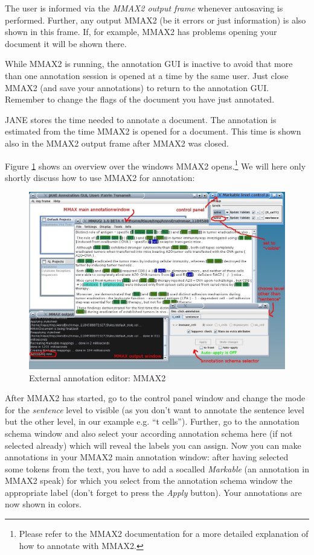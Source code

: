 \documentclass[DIV12,english,11pt,halfparskip]{scrartcl}
\begin{document}
The user is informed via the \emph{MMAX2 output frame} whenever
autosaving is performed.  Further, any output MMAX2 (be it errors or
just information) is also shown in this frame. If, for example, MMAX2
has problems opening your document it will be shown there. 

While MMAX2 is running, the annotation GUI is inactive to avoid that
more than one annotation session is opened at a time by the same
user. Just close MMAX2 (and save your annotations) to return to the
annotation GUI. Remember to change the flags of the document you have
just annotated.

JANE stores the time needed to annotate a document. The annotation is
estimated from the time MMAX2 is opened for a document. This time is
shown also in the MMAX2 output frame after MMAX2 was closed.

Figure \ref{fig:mmax} shows an overview over the windows MMAX2
opens.\footnote{Please refer to the MMAX2 documentation for a more
  detailed explanation of how to annotate with MMAX2.} We will here
only shortly discuss how to use MMAX2 for annotation:

\begin{figure}[tb]
  \centering
  \includegraphics[scale=0.4]{figs/MMAX2.jpg}
  \caption{External annotation editor: MMAX2}
  \label{fig:mmax}
\end{figure}



After MMAX2 has started, go to the control panel window and change the
mode for the \emph{sentence} level to visible (as you don't want to
annotate the sentence level but the other level, in our example e.g.
``t cells''). Further, go to the annotation schema window and also
select your according annotation schema here (if not selected already)
which will reveal the labels you can assign. Now you can make
annotations in your MMAX2 main annotation window: after having selected
some tokens from the text, you have to add a socalled \emph{Markable}
(an annotation in MMAX2 speak) for which you select from the annotation
schema window the appropriate label (don't forget to press the
\emph{Apply} button). Your annotations are now shown in colors.
\end{document}
